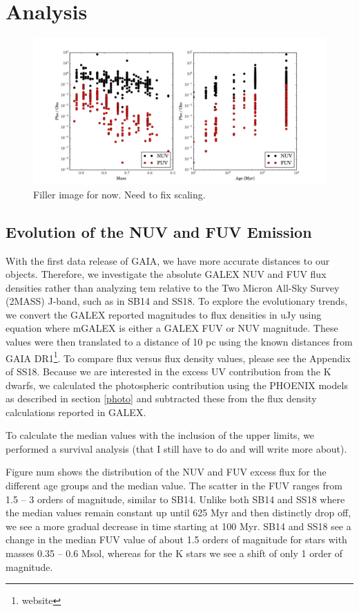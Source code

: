 \documentclass[twocolumn]{aastex62}
\begin{document}
\section{Analysis}



\begin{figure}[h]
\includegraphics[width=\linewidth]{phot_obs.pdf}
\caption{Filler image for now. Need to fix scaling. \label{fig:phot_obs}}
\end{figure}

\subsection{Evolution of the NUV and FUV Emission}


With the first data release of GAIA, we have more accurate distances to our objects. Therefore, we investigate the absolute GALEX NUV and FUV flux densities rather than analyzing tem relative to the Two Micron All-Sky Survey (2MASS) J-band, such as in SB14 and SS18. To explore the evolutionary trends, we convert the GALEX reported magnitudes to flux densities in uJy using
equation
where mGALEX is either a GALEX FUV or NUV magnitude. These values were then translated to a distance of 10 pc using the known distances from GAIA DR1\footnote{website}. To compare flux versus flux density values, please see the Appendix of SS18. 
Because we are interested in the excess UV contribution from the K dwarfs, we calculated the photospheric contribution using the PHOENIX models as described in section \ref{photo} and subtracted these from the flux density calculations reported in GALEX. 

To calculate the median values with the inclusion of the upper limits, we performed a survival analysis (that I still have to do and will write more about). 

Figure num shows the distribution of the NUV and FUV excess flux for the different age groups and the median value. The scatter in the FUV ranges from 1.5 – 3 orders of magnitude, similar to SB14. Unlike both SB14 and SS18 where the median values remain constant up until 625 Myr and then distinctly drop off, we see a more gradual decrease in time starting at 100 Myr. SB14 and SS18 see a change in the median FUV value of about 1.5 orders of magnitude for stars with masses 0.35 – 0.6 Msol, whereas for the K stars we see a shift of only 1 order of magnitude. 
\end{document}
